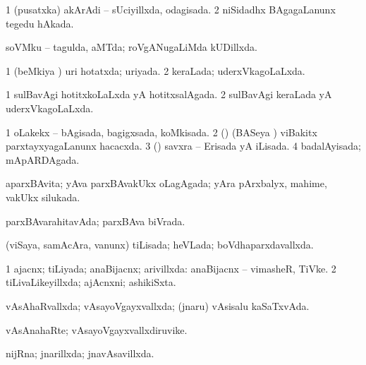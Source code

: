{{\bentry
{} 
\gl{\gu}
\expl{}
\bmng
\bnum
\num{1} (pusatxka) akArAdi -- sUciyillxda, odagisada. 
\num{2} niSidadhx BAgagaLanunx tegedu hAkada. 
\enum
\emng
\eentry

\bentry
{} 
\gl{\gu}
\expl{}
\bmng
soVMku -- tagulda, aMTda; roVgANugaLiMda kUDillxda. 
\emng
\eentry

\bentry
{} 
\gl{\gu}
\expl{}
\bmng
\bnum
\num{1} (beMkiya \vi) uri hotatxda; uriyada. 
\num{2} keraLada; uderxVkagoLaLxda. 
\enum
\emng
\eentry

\bentry
{} 
\gl{\gu}
\expl{}
\bmng
\bnum
\num{1} sulBavAgi hotitxkoLaLxda yA hotitxsalAgada. 
\num{2} sulBavAgi keraLada yA uderxVkagoLaLxda. 
\enum
\emng
\eentry

\bentry
{} 
\gl{\gu}
\expl{}
\bmng
\bnum
\num{1} oLakekx -- bAgisada, bagigxsada, koMkisada. 
\num{2} (\vAyx) (BASeya \vi) viBakitx parxtayxyagaLanunx hacacxda. 
\num{3} (\saM) savxra -- Erisada yA iLisada. 
\num{4} badalAyisada; mApARDAgada. 
\enum
\emng
\eentry

\bentry
{} 
\gl{\gu}
\expl{}
\bmng
aparxBAvita; yAva parxBAvakUkx oLagAgada; yAra pArxbalyx, mahime, \mo vakUkx silukada. 
\emng
\eentry

\bentry
{} 
\gl{\gu}
\expl{}
\bmng
parxBAvarahitavAda; parxBAva biVrada. 
\emng
\eentry

\bentry
{} 
\gl{\gu}
\expl{}
\bmng
(viSaya, samAcAra, \mo vanunx) tiLisada; heVLada; boVdhaparxdavallxda. 
\emng
\eentry

\bentry
{} 
\gl{\gu}
\expl{}
\bmng
\bnum
\num{1} ajacnx; tiLiyada; anaBijacnx; arivillxda:  anaBijacnx -- vimasheR, TiVke. 
\num{2} tiLivaLikeyillxda; ajAcnxni; ashikiSxta. 
\enum
\emng
\eentry

\bentry
{} 
\gl{\gu}
\expl{}
\bmng
vAsAhaRvallxda; vAsayoVgayxvallxda; (jnaru) vAsisalu kaSaTxvAda. 
\emng
\eentry

\bentry
{} 
\gl{\nA}
\expl{}
\bmng
vAsAnahaRte; vAsayoVgayxvallxdiruvike. 
\emng
\eentry

\bentry
{} 
\gl{\gu}
\expl{}
\bmng
nijRna; jnarillxda; jnavAsavillxda. 
\emng
\eentry

}}

